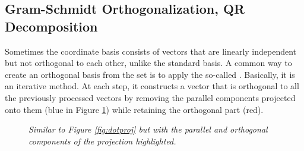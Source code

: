 \subsection{Gram-Schmidt Orthogonalization, QR Decomposition}
\label{section:GSortho}
Sometimes the coordinate basis consists of vectors that are linearly independent but not orthogonal to each other, unlike the standard basis. A common way to create an orthogonal basis from the set is to apply the so-called . Basically, it is an iterative method. At each step, it constructs a vector that is orthogonal to all the previously processed vectors by removing the parallel components projected onto them (blue in Figure \ref{fig:7.3}) while retaining the orthogonal part (red).
\begin{figure}[ht!]
\centering
{}
\caption{\textit{Similar to Figure \ref{fig:dotproj} but with the parallel and orthogonal components of the projection highlighted.}}
\label{fig:7.3}
\end{figure}
